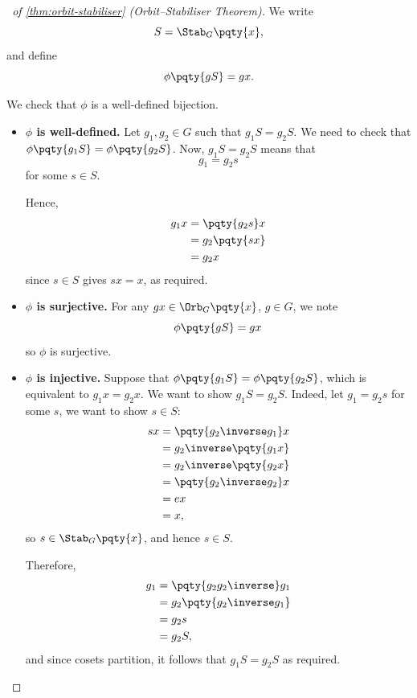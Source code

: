 \begin{proof}[\proofname\ of \autoref{thm:orbit-stabiliser} (Orbit--Stabiliser Theorem)]
    We write
    \[
        S = \Stab_{G} \pqty{x},
    \]
    and define
    \[
        \phi \pqty{gS} = gx.
    \]

    We check that \(\phi\) is a well-defined bijection.

    \begin{itemize}
        \item \textbf{\(\phi\) is well-defined.} Let \(g_1, g_2 \in G\) such that \(g_1 S = g_2 S\). We need to check that \(\phi\pqty{g_1 S} = \phi\pqty{g_2 S}\). Now, \(g_1 S = g_2 S\) means that
        \[
            g_1 = g_2 s
        \]
        for some \(s \in S\).

        Hence,
        \begin{align*}
            g_1 x &= \pqty{g_2 s} x \\
            &= g_2 \pqty{sx} \\
            &= g_2 x
        \end{align*}
        since \(s \in S\) gives \(sx = x\), as required.

        \item \textbf{\(\phi\) is surjective.} For any \(gx \in \Orb_{G} \pqty{x}\), \(g \in G\), we note
        \[
            \phi\pqty{gS} = gx
        \]
        so \(\phi\) is surjective.

        \item \textbf{\(\phi\) is injective.} Suppose that \(\phi\pqty{g_1 S} = \phi\pqty{g_2 S}\), which is equivalent to \(g_1 x = g_2 x\). We want to show \(g_1 S = g_2 S\). Indeed, let \(g_1 = g_2 s\) for some \(s\), we want to show \(s \in S\):
        \begin{align*}
            sx &= \pqty{g_2 \inverse g_1} x \\
            &= g_2 \inverse \pqty{g_1 x} \\
            &= g_2 \inverse \pqty{g_2 x} \\
            &= \pqty{g_2 \inverse g_2} x \\
            &= ex \\
            &= x,
        \end{align*}
        so \(s \in \Stab_{G} \pqty{x}\), and hence \(s \in S\).

        Therefore,
        \begin{align*}
            g_1 &= \pqty{g_2 g_2\inverse} g_1 \\
            &= g_2 \pqty{g_2\inverse g_1} \\
            &= g_2 s \\
            &= g_2 S,
        \end{align*}
        and since cosets partition, it follows that \(g_1 S = g_2 S\) as required.
    \end{itemize}
\end{proof}

